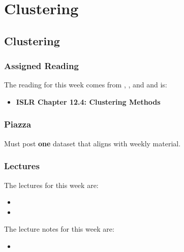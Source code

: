 \clearpage

\renewcommand{\ChapTitle}{Clustering}
\renewcommand{\SectionTitle}{Clustering}

\chapter{\ChapTitle}
\section{\SectionTitle}

\subsection{Assigned Reading}

The reading for this week comes from \ISLRPython, \ISLRR, and \ESLII \hspace*{1pt} and is:

\begin{itemize}
    \item \textbf{ISLR Chapter 12.4: Clustering Methods}
\end{itemize}

\subsection{Piazza}

Must post \textbf{one} dataset that aligns with weekly material.

\subsection{Lectures}

The lectures for this week are:

\begin{itemize}
    \item {}
    \item {}
\end{itemize}

\noindent The lecture notes for this week are:

\begin{itemize}
    \item {}
\end{itemize}

